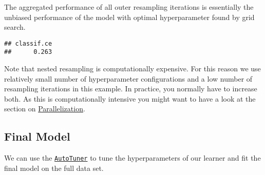 \documentclass[
]{scrbook}
\newenvironment{Shaded}{\begin{snugshade}}{\end{snugshade}}
\newcommand{\FunctionTok}[1]{\textcolor[rgb]{0.00,0.00,0.00}{#1}}
\newcommand{\NormalTok}[1]{#1}
\newcommand{\SpecialCharTok}[1]{\textcolor[rgb]{0.00,0.00,0.00}{#1}}
\renewenvironment{Shaded} {\begin{snugshade}\small} {\end{snugshade}}
\begin{document}
The aggregated performance of all outer resampling iterations is essentially the unbiased performance of the model with optimal hyperparameter found by grid search.

\begin{Shaded}
\end{Shaded}

\begin{verbatim}
## classif.ce 
##      0.263
\end{verbatim}

Note that nested resampling is computationally expensive.
For this reason we use relatively small number of hyperparameter configurations and a low number of resampling iterations in this example.
In practice, you normally have to increase both.
As this is computationally intensive you might want to have a look at the section on \protect\hyperlink{parallelization}{Parallelization}.

\hypertarget{nested-final-model}{%
\subsection{Final Model}\label{nested-final-model}}

We can use the \href{https://mlr3tuning.mlr-org.com/reference/AutoTuner.html}{\texttt{AutoTuner}} to tune the hyperparameters of our learner and fit the final model on the full data set.

\begin{Shaded}
\end{Shaded}
\end{document}
